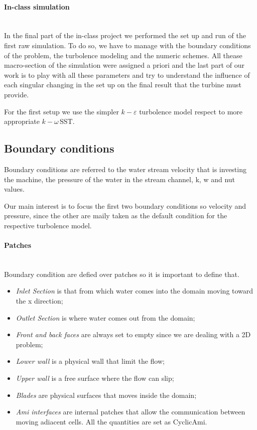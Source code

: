 \documentclass[a4paper,12pt]{article}
\begin{document}
\paragraph{In-class simulation}\mbox{}\\
In the final part of the in-class project we performed the set up and run of the first raw simulation.
To do so, we have to manage with the boundary conditions of the problem, the turbolence modeling and the numeric schemes. All thease macro-section of the simulation were assigned a priori and the last part of our work is to play with all these parameters and try to understand the influence of each singular changing in the set up on the final result that the turbine must provide.

For the first setup we use the simpler $k\!-\!\varepsilon$ turbolence model respect to more appropriate $k\!-\!\omega \, \text{SST}$.

\subsection{Boundary conditions}
Boundary conditions are referred to the water stream velocity that is investing the machine, the pressure of the water in the stream channel, k, w and nut values.

Our main interest is to focus the first two boundary conditions so velocity and pressure, since the other are maily taken as the default condition for the respective turbolence model.

\paragraph{Patches}\mbox{}\\
Boundary condition are defied over patches so it is important to define that.
\begin{itemize}
\item \emph{Inlet Section} is that from which water comes into the domain moving toward the x direction;
\item \emph{Outlet Section} is where water comes out from the domain;
\item \emph{Front and back faces} are always set to empty since we are dealing with a 2D problem;
\item \emph{Lower wall} is a physical wall that limit the flow;
\item \emph{Upper wall} is a free surface where the flow can slip;
\item \emph{Blades} are physical surfaces that moves inside the domain;
\item \emph{Ami interfaces} are internal patches that allow the communication between moving adiacent cells. All the quantities are set as CyclicAmi.
\end{itemize}
\end{document}

